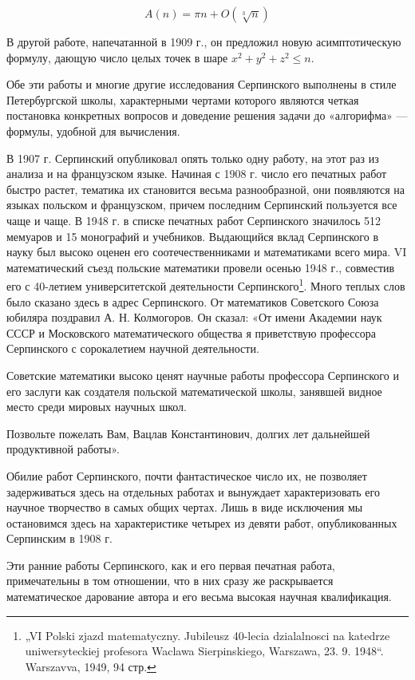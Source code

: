 \documentclass[12pt, a4paper, openany]{book}
\begin{document}
$$
A(n) = \pi n + O(\sqrt[3]{n})
$$
	
	В другой работе, напечатанной в 1909 г., он предложил новую асимптотическую формулу, дающую число целых точек в шаре $x^2+y^2 + z^2\leqslant n$.
	
	Обе эти работы и многие другие исследования Серпинского выполнены в стиле Петербургской школы, характерными чертами которого являются четкая постановка конкретных вопросов и доведение решения задачи до «алгорифма» — формулы, удобной для вычисления.
	
	В 1907 г. Серпинский опубликовал опять только одну работу, на этот раз из анализа и на французском языке. Начиная с 1908 г. число его печатных работ быстро растет, тематика их становится весьма разнообразной, они появляются на языках польском и французском, причем последним Серпинский пользуется все чаще и чаще. В 1948 г. в списке печатных работ Серпинского значилось 512 мемуаров и 15 монографий и учебников. Выдающийся вклад Серпинского в науку был высоко оценен его соотечественниками и математиками всего мира. VI математический съезд польские математики провели осенью 1948 г., совместив его с 40-летием университетской деятельности Серпинского{\footnote{„VI Polski zjazd matematyczny. Jubileusz 40-lecia dzialalnosci na katedrze uniwersyteckiej profesora Waclawa Sierpinskiego, Warszawa, 23. 9. 1948“. Warszavva, 1949, 94 стр.}}. Много теплых слов было сказано здесь в адрес Серпинского. От математиков Советского Союза юбиляра поздравил А. Н. Колмогоров. Он сказал: «От имени Академии наук СССР и Московского математического общества я приветствую профессора Серпинского с сорокалетием научной деятельности.
	
	Советские математики высоко ценят научные работы профессора Серпинского и его заслуги как создателя польской математической школы, занявшей видное место среди мировых научных школ.
	
	Позвольте пожелать Вам, Вацлав Константинович, долгих лет дальнейшей продуктивной работы».
	
	Обилие работ Серпинского, почти фантастическое число их, не позволяет задерживаться здесь на отдельных работах и вынуждает характеризовать его научное творчество в самых общих чертах. Лишь в виде исключения мы остановимся здесь на характеристике четырех из девяти работ, опубликованных Серпинским в 1908 г.
	
	Эти ранние работы Серпинского, как и его первая печатная работа, примечательны в том отношении, что в них сразу же раскрывается математическое дарование автора и его весьма высокая научная квалификация.
	
\end{document}
